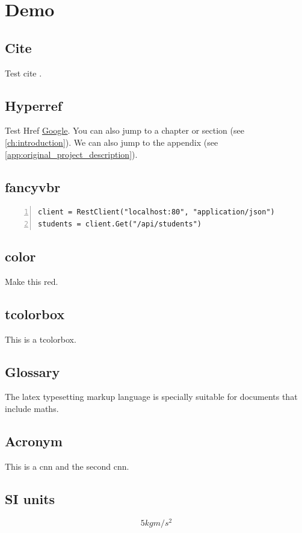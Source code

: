 \chapter*{Demo}
\section*{Cite}
Test cite .

\section*{Hyperref}
Test Href \href{http://google.ch}{Google}. You can also jump to a chapter or section (see \ref{ch:introduction}). We can also jump to the appendix (see \ref{app:original_project_description}).

\section*{fancyvbr}

\begin{Verbatim}[numbers=left, frame=single]
client = RestClient("localhost:80", "application/json")
students = client.Get("/api/students")
\end{Verbatim}

\section*{color}
Make {\color{red} this} red.

\section*{tcolorbox}
\begin{tcolorbox}
This is a tcolorbox.
\end{tcolorbox}

\section*{Glossary}
The \gls{latex} typesetting markup language is specially suitable 
for documents that include \gls{maths}. 

\section*{Acronym}
This is a \gls{cnn} and the second \gls{cnn}.

\section*{SI units}
\[5 kg m /s^2\]

